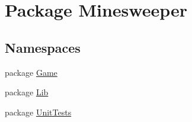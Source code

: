 \hypertarget{namespace_minesweeper}{\section{Package Minesweeper}
\label{namespace_minesweeper}
}
\subsection*{Namespaces}
\begin{DoxyCompactItemize}
\item 
package \hyperlink{namespace_minesweeper_1_1_game}{Game}
\item 
package \hyperlink{namespace_minesweeper_1_1_lib}{Lib}
\item 
package \hyperlink{namespace_minesweeper_1_1_unit_tests}{Unit\+Tests}
\end{DoxyCompactItemize}

